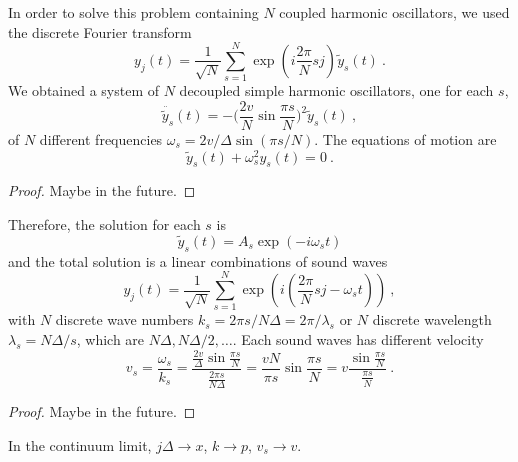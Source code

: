     In order to solve this problem containing $N$ coupled harmonic oscillators, we used the discrete Fourier transform
    \begin{equation*}
        y_j (t) = \frac{1}{\sqrt{N}} \sum_{s = 1}^N \exp(i \frac{2\pi}{N} s j) \tilde y_s(t) ~.
    \end{equation*}
    We obtained a system of $N$ decoupled simple harmonic oscillators, one for each $s$,
    \begin{equation*}
        \ddot{\tilde y_s} (t) = - \Big ( \frac{2 v}{N} \sin \frac{\pi s}{N}\Big)^2  \tilde y_s (t) ~,
    \end{equation*}
    of $N$ different frequencies $\omega_s = 2 v / \Delta \sin (\pi s /N)$. The equations of motion are 
    \begin{equation*}
        \tilde y_s (t) + \omega^2_s y_s (t) = 0 ~.
    \end{equation*}
    \begin{proof}
        Maybe in the future.
    \end{proof}

    Therefore, the solution for each $s$ is 
    \begin{equation*}
        \tilde y_s (t) = A_s \exp(- i \omega_s t) 
    \end{equation*}
    and the total solution is a linear combinations of sound waves 
    \begin{equation*}
        y_j (t) = \frac{1}{\sqrt{N}} \sum_{s = 1}^N \exp(i (\frac{2\pi}{N} s j - \omega_s t)) ~,
    \end{equation*}
    with $N$ discrete wave numbers $k_s = 2 \pi s / N \Delta = 2 \pi / \lambda_s$ or $N$ discrete wavelength $\lambda_s = N \Delta / s$, which are $N\Delta, N\Delta/2, \ldots$. Each sound waves has different velocity 
    \begin{equation*}
        v_s = \frac{\omega_s}{k_s} = \frac{\frac{2 v }{\Delta} \sin \frac{\pi s}{N}}{\frac{2 \pi s}{N \Delta}} = \frac{v N}{\pi s} \sin \frac{\pi s}{N} = v \frac{\sin \frac{\pi s}{N}}{\frac{\pi s}{N}} ~.
    \end{equation*}
    \begin{proof}
        Maybe in the future.
    \end{proof}

    In the continuum limit, $j \Delta \rightarrow x$, $k \rightarrow p$, $v_s \rightarrow v$.

